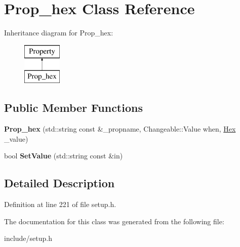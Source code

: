 \hypertarget{classProp__hex}{\section{Prop\-\_\-hex Class Reference}
\label{classProp__hex}
}
Inheritance diagram for Prop\-\_\-hex\-:\begin{figure}[H]
\begin{center}
\leavevmode
\includegraphics[height=2.000000cm]{classProp__hex}
\end{center}
\end{figure}
\subsection*{Public Member Functions}
\begin{DoxyCompactItemize}
\item 
\hypertarget{classProp__hex_a5a9df57c5efae0c495056cda181ccf40}{{\bfseries Prop\-\_\-hex} (std\-::string const \&\-\_\-propname, Changeable\-::\-Value when, \hyperlink{classHex}{Hex} \-\_\-value)}\label{classProp__hex_a5a9df57c5efae0c495056cda181ccf40}

\item 
\hypertarget{classProp__hex_ab1461b9f682fa0aac1e45d544905aaed}{bool {\bfseries Set\-Value} (std\-::string const \&in)}\label{classProp__hex_ab1461b9f682fa0aac1e45d544905aaed}

\end{DoxyCompactItemize}


\subsection{Detailed Description}


Definition at line 221 of file setup.\-h.



The documentation for this class was generated from the following file\-:\begin{DoxyCompactItemize}
\item 
include/setup.\-h\end{DoxyCompactItemize}
